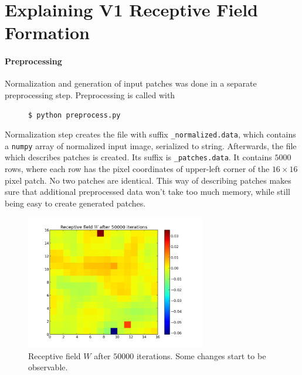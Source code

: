 \section{Explaining V1 Receptive Field Formation}

\paragraph{Preprocessing}
Normalization and generation of input patches was done in a separate
preprocessing step. Preprocessing is called with
\begin{figure}[!htbl]
    \begin{verbatim}
$ python preprocess.py
\end{verbatim}
\end{figure}

Normalization step creates the file with suffix \texttt{\_normalized.data},
which contains a \texttt{numpy} array of normalized input image, serialized to
string. Afterwards, the file which describes patches is created. Its suffix is
\texttt{\_patches.data}. It contains $5000$ rows, where each row has the pixel
coordinates of upper-left corner of the $16\times16$ pixel patch. No two
patches are identical. This way of describing patches makes sure that additional
preprocessed data won't take too much memory, while still being easy to create
generated patches.

\begin{figure}[h]
\centering
\includegraphics[width=0.7\textwidth]{../ex3/results1/img06}
\caption{Receptive field $W$ after $50000$ iterations. Some changes start to be
observable.}
\label{fig:img06}
\end{figure}

